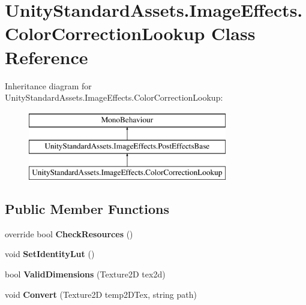 \hypertarget{class_unity_standard_assets_1_1_image_effects_1_1_color_correction_lookup}{}\section{Unity\+Standard\+Assets.\+Image\+Effects.\+Color\+Correction\+Lookup Class Reference}
\label{class_unity_standard_assets_1_1_image_effects_1_1_color_correction_lookup}
Inheritance diagram for Unity\+Standard\+Assets.\+Image\+Effects.\+Color\+Correction\+Lookup\+:\begin{figure}[H]
\begin{center}
\leavevmode
\includegraphics[height=3.000000cm]{class_unity_standard_assets_1_1_image_effects_1_1_color_correction_lookup}
\end{center}
\end{figure}
\subsection*{Public Member Functions}
\begin{DoxyCompactItemize}
\item 
override bool {\bfseries Check\+Resources} ()\hypertarget{class_unity_standard_assets_1_1_image_effects_1_1_color_correction_lookup_a509c6ad96fc5b0d58ac768c076bd84cf}{}\label{class_unity_standard_assets_1_1_image_effects_1_1_color_correction_lookup_a509c6ad96fc5b0d58ac768c076bd84cf}

\item 
void {\bfseries Set\+Identity\+Lut} ()\hypertarget{class_unity_standard_assets_1_1_image_effects_1_1_color_correction_lookup_a72b9f5d589f1e274264bd0f5c6ad4e05}{}\label{class_unity_standard_assets_1_1_image_effects_1_1_color_correction_lookup_a72b9f5d589f1e274264bd0f5c6ad4e05}

\item 
bool {\bfseries Valid\+Dimensions} (Texture2D tex2d)\hypertarget{class_unity_standard_assets_1_1_image_effects_1_1_color_correction_lookup_a0f74566f8e45868f7b5e2e98e08f28b5}{}\label{class_unity_standard_assets_1_1_image_effects_1_1_color_correction_lookup_a0f74566f8e45868f7b5e2e98e08f28b5}

\item 
void {\bfseries Convert} (Texture2D temp2\+D\+Tex, string path)\hypertarget{class_unity_standard_assets_1_1_image_effects_1_1_color_correction_lookup_ad3838751bf4f0c07e63ef530e3b7cff0}{}\label{class_unity_standard_assets_1_1_image_effects_1_1_color_correction_lookup_ad3838751bf4f0c07e63ef530e3b7cff0}

\end{DoxyCompactItemize}
